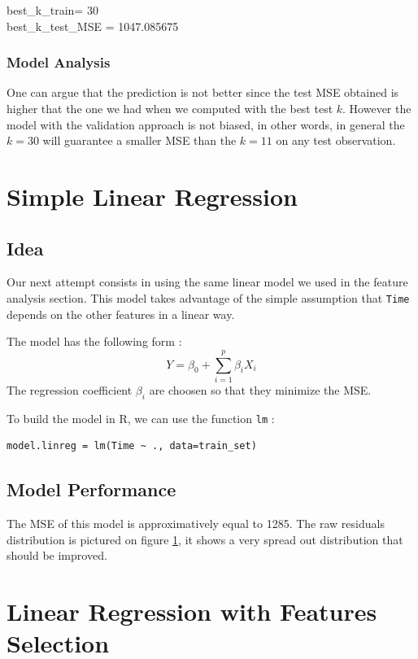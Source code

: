 \documentclass[]{report}
\newcommand{\inputtikz}[2]{%
	\scalebox{#1}{}  
}
\begin{document}
\begin{center} 
	best\_k\_train= 30 \\
	best\_k\_test\_MSE = 1047.085675
\end{center}

\subsubsection{Model Analysis}
One can argue that the prediction is not better since the test MSE obtained is higher that the one we had when we computed with the best test $k$. However the model with the validation approach is not biased, in other words, in general the $k=30$ will guarantee a smaller MSE than the $k=11$ on any test observation.

\section{Simple Linear Regression}
\subsection{Idea}
Our next attempt consists in using the same linear model we used in the feature analysis section. This model takes advantage of the simple assumption that \texttt{Time} depends on the other features in a linear way.

The model has the following form :
$$
	Y = \beta_0 + \sum_{i = 1}^{p} \beta_i X_i
$$
The regression coefficient $\beta_i$ are choosen so that they minimize the MSE. 

To build the model in R, we can use the function \texttt{lm} :
\begin{lstlisting}
model.linreg = lm(Time ~ ., data=train_set)
\end{lstlisting}

\subsection{Model Performance}
The MSE of this model is approximatively equal to 1285. The raw residuals distribution is pictured on figure \ref{fig:linreg_hist}, it shows a very spread out distribution that should be improved.

\begin{figure}[!h]
	\centering
	\inputtikz{0.5}{Figures/linreg_hist.tex}
	\caption{}
	\label{fig:linreg_hist}
\end{figure}

\section{Linear Regression with Features Selection}
\end{document}
